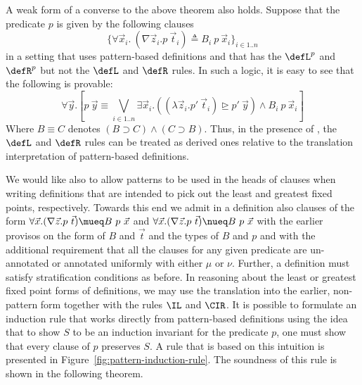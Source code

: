 A weak form of a converse to the above theorem also holds. Suppose
that the predicate $p$ is given by the following clauses
\begin{equation*}
\{\forall \vec{x}_i.~ (\nabla \vec{z}_i. p\ \vec{t}_i) \triangleq
B_i\ p\ \vec{x}_i\}_{i\in 1..n}
\end{equation*}
in a setting that uses pattern-based definitions and that has the
$\defL^p$ and $\defR^p$ but not the $\defL$ and $\defR$ rules. In such
a logic, it is easy to see that the following is provable:
\begin{equation*}
\forall \vec{y} . \left[p\ \vec{y} \equiv \bigvee_{i\in 1..n} \exists
  \vec{x}_i . ((\lambda \vec{z}_i . p'\ \vec{t}_i) \unrhd p'\ \vec{y})
  \land B_i\ p\ \vec{x}_i\right]
\end{equation*}
Where $B \equiv C$ denotes $(B \supset C) \land (C \supset B)$. Thus,
in the presence of \cut, the $\defL$ and $\defR$ rules can be treated
as derived ones relative to the translation interpretation of
pattern-based definitions.




















We would like also to allow patterns to be used in the heads of
clauses when writing definitions that are intended to pick out the
least and greatest fixed points, respectively. Towards this end we
admit in a definition also clauses of the form $\forall
\vec{x}.(\nabla \vec{z}. p\ \vec{t}) \mueq B\ p\ \vec{x}$ and $\forall
\vec{x}.(\nabla \vec{z}. p\ \vec{t}) \nueq B\ p\ \vec{x}$ with the
earlier provisos on the form of $B$ and $\vec{t}$ and the types of $B$ and
$p$ and with the additional requirement that all the clauses for any
given predicate are un-annotated or annotated uniformly with either $\mu$ or
$\nu$. Further, a definition must satisfy stratification conditions as
before. In reasoning about the least or greatest fixed point forms of
definitions, we may use the translation into the earlier, non-pattern
form together with the rules $\IL$ and $\CIR$. It is possible to
formulate an induction rule that works directly from pattern-based
definitions using the idea that to show $S$ to be an induction
invariant for the predicate $p$, one must show that every clause of
$p$ preserves $S$. A rule that is based on this intuition is presented
in Figure~\ref{fig:pattern-induction-rule}. The soundness of this rule
is shown in the following theorem.

